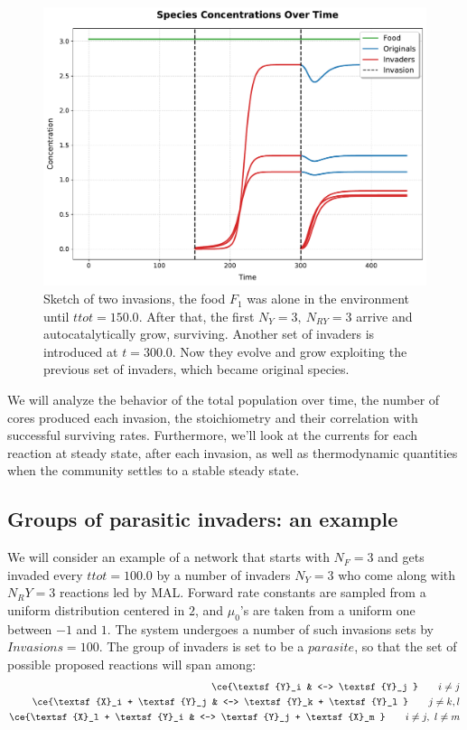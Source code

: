 \documentclass{article}
\begin{document}
\begin{figure}[H]
    \centering
    \includegraphics[width=0.6\linewidth]{Successive_species_concentrations_TRIAL.pdf} 
    \caption{\small{Sketch of two invasions, the food $F_1$ was alone in the environment until $ttot=150.0$. After that, the first $N_Y=3, \ N_{RY}=3$ arrive and autocatalytically grow, surviving. Another set of invaders is introduced at $t=300.0$. Now they evolve and grow exploiting the previous set of invaders, which became original species.}}
    \label{Fig. 10}
\end{figure}

We will analyze the behavior of the total population over time, the number of cores produced each invasion, the stoichiometry and their correlation with successful surviving rates. Furthermore, we'll look at the currents for each reaction at steady state, after each invasion, as well as thermodynamic quantities when the community settles to a stable steady state.

\subsection{Groups of parasitic invaders: an example}

We will consider an example of a network that starts with $N_F=3$ and gets invaded every $ttot = 100.0$ by a number of invaders $N_Y = 3$ who come along with $N_RY = 3$ reactions led by MAL. Forward rate constants are sampled from a uniform distribution centered in $2$, and $\mu_0$'s are taken from a uniform one between $-1$ and $1$. The system undergoes a number of such invasions sets by $Invasions = 100$. The group of invaders is set to be a $parasite$, so that the set of possible proposed reactions will span among:
\begin{equation}
		\begin{split}
\ce{\textsf{Y}_i & <--> \textsf{Y}_j } \quad \quad i \neq j \\ 
\ce{\textsf{X}_i + \textsf{Y}_j & <--> \textsf{Y}_k + \textsf{Y}_l } \quad \quad j \neq k,l \\ 
\ce{\textsf{X}_l + \textsf{Y}_i & <--> \textsf{Y}_j + \textsf{X}_m } \quad \quad i \neq j , \ l \neq m\\ 
\end{split} 
\end{equation}
\end{document}
